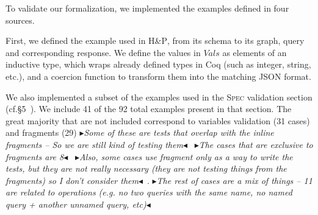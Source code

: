 \documentclass[sigplan,10pt,anonymous,review,nonacm]{acmart}
\makeatletter
\newcommand{\mynote}[3]
    {{\color{#3} \fbox{\bfseries\sffamily\scriptsize#1}
    {\small$\blacktriangleright$\textsf{\emph{#2}}$\blacktriangleleft$}}~}
\newcommand{\td}[1]{\mynote{TD}{#1}{blue}}
\newcommand{\plstyle}[1]{\mbox{\textsc{#1}}\xspace}
\newcommand{\spec}{\plstyle{Spec}}
\newcommand{\HP}{\plstyle{H\&P}}
\newcommand{\eg}{e.g.\@\xspace}
\newcommand{\cf}{cf.\@\xspace}
\makeatother
\begin{document}
To validate our formalization, we implemented the examples defined in four sources. 

First, we defined the example used in \HP, from its schema to its graph, query and corresponding response. 
We define the values in $\mathit{Vals}$ as elements of an inductive type, which wraps already defined types in Coq
(such as integer, string, etc.), and a coercion function to transform them into the matching JSON format.
 

We also implemented a subset of the examples used in the \spec validation section (\cf\S5~\cite{gqlspec}).
We include 41 of the 92 total examples present in that section. The great majority that are not included correspond to 
variables validation (31 cases) and fragments (29)\td{Some of these are tests that overlap with the inline fragments -- So we are still kind of testing them}
\td{The cases that are exclusive to fragments are 8}\td{Also, some cases use fragment only as a way to write the tests, but they are not really necessary
(they are not testing things from the fragments) so I don't consider them}.
\td{The rest of cases are a mix of things -- 11 are related to operations (\eg no two queries with the same name, no named query + another unnamed query, etc)}


\iffalse
	-	Only executable definitions when evaluating = -1 (text + query)
	- Uniqueness of operation = -3
	- Anonymous operation = -2
	- Suscription = -5 (single root field)
	- Fields = 2 + 2 + 2 - 1 (introspection on union)
	- Field merging = 3 + 1 - 1 (variable) + 2 - 2  (variables) + 2  + 1
	- Leaf fields = 2 + 3 - 1 (type ext)
	- Argument names = 2 - 1 (directives) + 1 - 1 (directives) + 2  - 1 (type extension)
	- Required args = -5 (required arguments - non-null + default values)
	- Fragment uniqueness = -2 (fragments)
	- Fragment spread type existence = 1 - 3 (2 fragments y 1 directive) + 1 - 2 (fragments)
	- Fragments on comp types = 3 - 3 (fragments) + 2 - 2 (fragments)
	- Fragments must be used = -1
	- Fragments spread = -4 (fragments) + 2 - 2 (fragments) + 1 - 2 (fragments) + 1 - 2 (fragments) + 2 - 2  + 2 - 2 + 1 - 2 + 1 - 2 
	- Valid Input values = -5
	- Input objects = -3
	- Directives = -3
	- Variables = - 2 - 8 - 7 - 4 - 7
	
	Hechos : 2 + 2 + 2 + 3 + 1 + 2 + 2 + 2 + 3 + 2 + 1 + 2  + 1 + 1 + 3 + 2 + 2 + 1 + 1 + 2 + 2 + 1 + 1 = 41
	No hechos : -1 - 3 - 2 - 5 - 1 - 1 - 2 - 1 - 1 - 1 - 1 - 5 - 2 - 3 - 2 - 3 - 2  - 1 - 2 - 2 - 2 - 2 - 2 - 2 -2 - 2 - 5 - 3 - 3 - 2 - 8 - 7 - 4 - 7  = 92
	- Variables = -1 - 2 - 2 - 8 - 7 - 4 - 7 = 31
	- Fragments = -2 - 2 - 2 - 3 - 2 - 1 - 4 - 2 - 2 - 2 - 2 - 2 - 1 - 2 = 29 
	- Operations = -1 - 3 - 2 - 5 = 11
	- Directives = -1 -1 - 1 - 3 = 6
	- Valid input values = 5
\fi 
	
\end{document}
